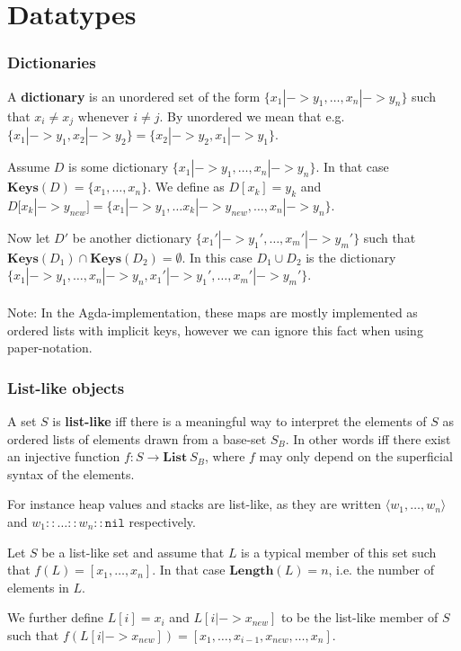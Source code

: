 \section{Datatypes}

\subsubsection{Dictionaries}
A \textbf{dictionary} is an unordered set of the form
$\{x_1 |-> y_1, \dots, x_n |-> y_n\}$ such that $x_i \neq x_j$ whenever
$i \neq j$. By unordered we mean that e.g.
$\{x_1 |-> y_1, x_2 |-> y_2\} = \{x_2 |-> y_2, x_1 |-> y_1\}$.

Assume $D$ is some dictionary $\{x_1 |-> y_1, \dots, x_n |-> y_n\}$. In that
case $\mathbf{Keys}(D) = \{x_1, \dots, x_n\}$. We define as $D[x_k] = y_k$ and
$D[x_k |-> y_{new}] = \{x_1 |-> y_1, \dots x_k |-> y_{new}, \dots, x_n |->
y_n\}$.

Now let $D'$ be another dictionary $\{x_1' |-> y_1', \dots, x_m' |-> y_m'\}$
such that $\mathbf{Keys}(D_1) \cap \mathbf{Keys}(D_2) = \emptyset$. In this case
$D_1 \cup D_2$ is the dictionary
$\{x_1 |-> y_1, \dots, x_n |-> y_n, x_1' |-> y_1', \dots, x_m' |-> y_m'\}$.

\paragraph{}
Note: In the Agda-implementation, these maps are mostly implemented as ordered
lists with implicit keys, however we can ignore this fact when using
paper-notation.

\subsubsection{List-like objects}
A set $S$ is \textbf{list-like} iff there is a meaningful way to interpret the
elements of $S$ as ordered lists of elements drawn from a base-set $S_B$. In
other words iff there exist an injective function
$f : S \to \mathbf{List}\ S_B$, where $f$ may only depend on the superficial
syntax of the elements.

For instance heap values and stacks are list-like, as they are written
$\langle w_1, \dots, w_n \rangle$ and $w_1 :: \dots :: w_n :: \mathtt{nil}$
respectively.

Let $S$ be a list-like set and assume that $L$ is a typical member of this set
such that $f(L) = [x_1, \dots, x_n]$. In that case $\mathbf{Length}(L) = n$,
i.e. the number of elements in $L$.

We further define $L[i] = x_i$ and $L[i |-> x_{new}]$ to be the list-like member
of $S$ such that
$f(L[i |-> x_{new}]) = [x_1, \dots, x_{i-1}, x_{new}, \dots, x_n]$.
